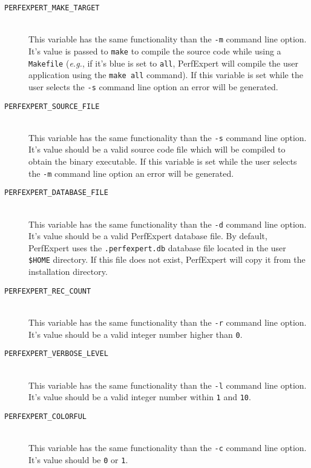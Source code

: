 \begin{description}
	\item[\texttt{PERFEXPERT\_MAKE\_TARGET}]\hfill \\
	This variable has the same functionality than the \texttt{-m} command line option. It's value is passed to \texttt{make} to compile the source code while using a \texttt{Makefile} (\textit{e.g.}, if it's blue is set to \texttt{all}, PerfExpert will compile the user application using the \texttt{make all} command). If this variable is set while the user selects the \texttt{-s} command line option an error will be generated.

	\item[\texttt{PERFEXPERT\_SOURCE\_FILE}]\hfill \\
	This variable has the same functionality than the \texttt{-s} command line option. It's value should be a valid source code file which will be compiled to obtain the binary executable. If this variable is set while the user selects the \texttt{-m} command line option an error will be generated.

	\item[\texttt{PERFEXPERT\_DATABASE\_FILE}]\hfill \\
	This variable has the same functionality than the \texttt{-d} command line option. It's value should be a valid PerfExpert database file. By default, PerfExpert uses the \texttt{.perfexpert.db} database file located in the user \texttt{\$HOME} directory. If this file does not exist, PerfExpert will copy it from the installation directory.

	\item[\texttt{PERFEXPERT\_REC\_COUNT}]\hfill \\
	This variable has the same functionality than the \texttt{-r} command line option. It's value should be a valid integer number higher than \texttt{0}.

	\item[\texttt{PERFEXPERT\_VERBOSE\_LEVEL}]\hfill \\
	This variable has the same functionality than the \texttt{-l} command line option. It's value should be a valid integer number within \texttt{1} and \texttt{10}.

	\item[\texttt{PERFEXPERT\_COLORFUL}]\hfill \\
	This variable has the same functionality than the \texttt{-c} command line option. It's value should be \texttt{0} or \texttt{1}.
	

\end{description}
